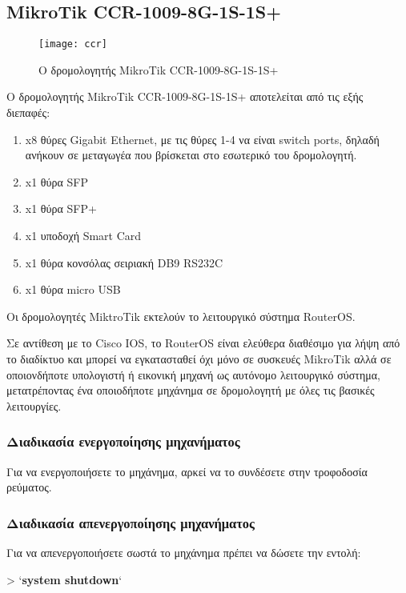 \documentclass{EdipyLabs} %
\begin{document}
\subsection{MikroTik CCR-1009-8G-1S-1S+}
\begin{figure}[H]
	\centering
	\texttt{[image: ccr]}
	\caption{Ο δρομολογητής MikroTik CCR-1009-8G-1S-1S+}\label{fig:ccr}
\end{figure}
Ο δρομολογητής MikroTik CCR-1009-8G-1S-1S+ αποτελείται από τις εξής διεπαφές:
\begin{enumerate}
	\item x8 θύρες Gigabit Ethernet, με τις θύρες 1-4 να είναι switch ports, δηλαδή ανήκουν σε μεταγωγέα που βρίσκεται στο εσωτερικό του δρομολογητή. 
	\item x1 θύρα SFP
	\item x1 θύρα SFP+
	\item x1 υποδοχή Smart Card
	\item x1 θύρα κονσόλας σειριακή DB9 RS232C
	\item x1 θύρα micro USB
\end{enumerate} 

Οι δρομολογητές MiktroTik εκτελούν το λειτουργικό σύστημα RouterOS.

Σε αντίθεση με το Cisco IOS, το RouterOS είναι ελεύθερα διαθέσιμο για λήψη από το διαδίκτυο και μπορεί να εγκατασταθεί όχι μόνο σε συσκευές MikroTik αλλά σε οποιονδήποτε υπολογιστή ή εικονική μηχανή ως αυτόνομο λειτουργικό σύστημα, μετατρέποντας ένα οποιοδήποτε μηχάνημα σε δρομολογητή με όλες τις βασικές λειτουργίες.

\subsubsection*{Διαδικασία ενεργοποίησης μηχανήματος}
Για να ενεργοποιήσετε το μηχάνημα, αρκεί να το συνδέσετε στην τροφοδοσία ρεύματος.

\subsubsection*{Διαδικασία απενεργοποίησης μηχανήματος}
Για να απενεργοποιήσετε σωστά το μηχάνημα πρέπει να δώσετε την εντολή:

\begin{CommandBox}
 > `\textbf{system shutdown}`
\end{CommandBox}

\end{document}
